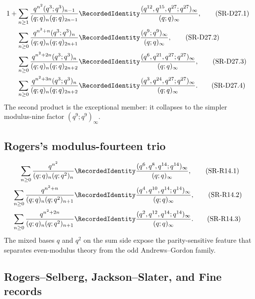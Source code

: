 \begin{align}
 1+\sum_{n\ge1}
 \frac{q^{n^2}(q^3;q^3)_{n-1}}
 {(q;q)_n(q;q)_{2n-1}}
 &\RecordedIdentity
 \frac{(q^{12},q^{15},q^{27};q^{27})_\infty}
 {(q;q)_\infty},
 \tag{SR-D27.1}\label{qg:eq-record-d27-1}\\
 \sum_{n\ge0}
 \frac{q^{n^2+n}(q^3;q^3)_n}
 {(q;q)_n(q;q)_{2n+1}}
 &\RecordedIdentity
 \frac{(q^9;q^9)_\infty}{(q;q)_\infty},
 \tag{SR-D27.2}\label{qg:eq-record-d27-2}\\
 \sum_{n\ge0}
 \frac{q^{n^2+2n}(q^3;q^3)_n}
 {(q;q)_n(q;q)_{2n+2}}
 &\RecordedIdentity
 \frac{(q^6,q^{21},q^{27};q^{27})_\infty}
 {(q;q)_\infty},
 \tag{SR-D27.3}\label{qg:eq-record-d27-3}\\
 \sum_{n\ge0}
 \frac{q^{n^2+3n}(q^3;q^3)_n}
 {(q;q)_n(q;q)_{2n+2}}
 &\RecordedIdentity
 \frac{(q^3,q^{24},q^{27};q^{27})_\infty}
 {(q;q)_\infty}.
 \tag{SR-D27.4}\label{qg:eq-record-d27-4}
\end{align}
The second product is the exceptional member: it collapses to the simpler
modulus-nine factor \((q^9;q^9)_\infty\).

\subsection{Rogers's modulus-fourteen trio}

\begin{align}
 \sum_{n\ge0}\frac{q^{n^2}}
 {(q;q)_n(q;q^2)_n}
 &\RecordedIdentity
 \frac{(q^6,q^8,q^{14};q^{14})_\infty}{(q;q)_\infty},
 \tag{SR-R14.1}\label{qg:eq-record-r14-1}\\
 \sum_{n\ge0}\frac{q^{n^2+n}}
 {(q;q)_n(q;q^2)_{n+1}}
 &\RecordedIdentity
 \frac{(q^4,q^{10},q^{14};q^{14})_\infty}{(q;q)_\infty},
 \tag{SR-R14.2}\label{qg:eq-record-r14-2}\\
 \sum_{n\ge0}\frac{q^{n^2+2n}}
 {(q;q)_n(q;q^2)_{n+1}}
 &\RecordedIdentity
 \frac{(q^2,q^{12},q^{14};q^{14})_\infty}{(q;q)_\infty}.
 \tag{SR-R14.3}\label{qg:eq-record-r14-3}
\end{align}
The mixed bases \(q\) and \(q^2\) on the sum side expose the parity-sensitive
feature that separates even-modulus theory from the odd Andrews--Gordon
family.

\subsection{Rogers--Selberg, Jackson--Slater, and Fine records}

